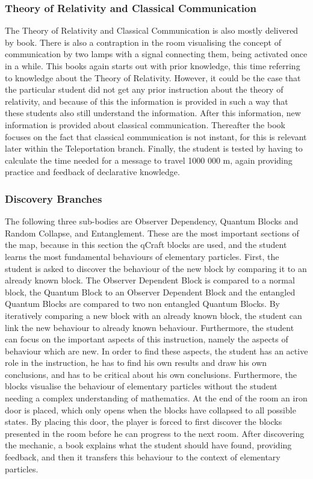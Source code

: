 \documentclass[11pt,twoside]{report} %
\begin{document}
\subsubsection{Theory of Relativity and Classical Communication}

The Theory of Relativity and Classical Communication is also mostly delivered by book. There is also a contraption in the room visualising the concept of communication by two lamps with a signal connecting them, being activated once in a while. This books again starts out with prior knowledge, this time referring to knowledge about the Theory of Relativity. However, it could be the case that the particular student did not get any prior instruction about the theory of relativity, and because of this the information is provided in such a way that these students also still understand the information. After this information, new information is provided about classical communication. Thereafter the book focuses on the fact that classical communication is not instant, for this is relevant later within the Teleportation branch. Finally, the student is tested by having to calculate the time needed for a message to travel 1000 000 m, again providing practice and feedback of declarative knowledge.

\subsubsection{Discovery Branches}

The following three sub-bodies are Observer Dependency, Quantum Blocks and Random Collapse, and Entanglement. These are the most important sections of the map, because in this section the qCraft blocks are used, and the student learns the most fundamental behaviours of elementary particles. First, the student is asked to discover the behaviour of the new block by comparing it to an already known block. The Observer Dependent Block is compared to a normal block, the Quantum Block to an Observer Dependent Block and the entangled Quantum Blocks are compared to two non entangled Quantum Blocks. By iteratively comparing a new block with an already known block, the student can link the new behaviour to already known behaviour. Furthermore, the student can focus on the important aspects of this instruction, namely the aspects of behaviour which are new. In order to find these aspects, the student has an active role in the instruction, he has to find his own results and draw his own conclusions, and has to be critical about his own conclusions. Furthermore, the blocks visualise the behaviour of elementary particles without the student needing a complex understanding of mathematics. At the end of the room an iron door is placed, which only opens when the blocks have collapsed to all possible states. By placing this door, the player is forced to first discover the blocks presented in the room before he can progress to the next room. After discovering the mechanic, a book explains what the student should have found, providing feedback, and then it transfers this behaviour to the context of elementary particles.
\end{document}
